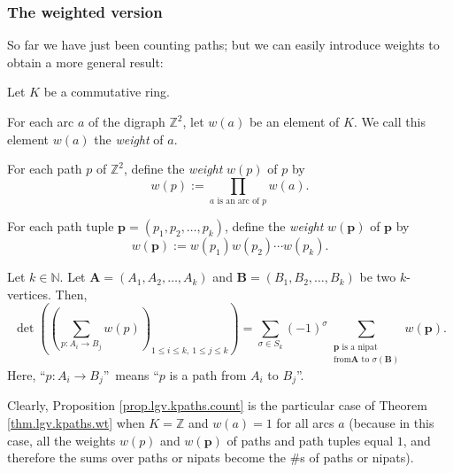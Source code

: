 \subsubsection{The weighted version}

So far we have just been counting paths; but we can easily introduce weights
to obtain a more general result:

\begin{theorem}
\label{thm.lgv.kpaths.wt}Let $K$ be a
commutative ring.

For each arc $a$ of the digraph $\mathbb{Z}^{2}$, let $w\left(  a\right)  $ be
an element of $K$. We call this element $w\left(  a\right)  $ the
\emph{weight} of $a$.

For each path $p$ of $\mathbb{Z}^{2}$, define the \emph{weight} $w\left(
p\right)  $ of $p$ by%
\[
w\left(  p\right)  :=\prod_{a\text{ is an arc of }p}w\left(  a\right)  .
\]


For each path tuple $\mathbf{p}=\left(  p_{1},p_{2},\ldots,p_{k}\right)  $,
define the \emph{weight} $w\left(  \mathbf{p}\right)  $ of $\mathbf{p}$ by%
\[
w\left(  \mathbf{p}\right)  :=w\left(  p_{1}\right)  w\left(  p_{2}\right)
\cdots w\left(  p_{k}\right)  .
\]


Let $k\in\mathbb{N}$. Let $\mathbf{A}=\left(  A_{1},A_{2},\ldots,A_{k}\right)
$ and $\mathbf{B}=\left(  B_{1},B_{2},\ldots,B_{k}\right)  $ be two
$k$-vertices. Then,%
\[
\det\left(  \left(  \sum_{p:A_{i}\rightarrow B_{j}}w\left(  p\right)  \right)
_{1\leq i\leq k,\ 1\leq j\leq k}\right)  =\sum_{\sigma\in S_{k}}\left(
-1\right)  ^{\sigma}\sum_{\substack{\mathbf{p}\text{ is a nipat}\\\text{from
}\mathbf{A}\text{ to }\sigma\left(  \mathbf{B}\right)  }}w\left(
\mathbf{p}\right)  .
\]
Here, \textquotedblleft$p:A_{i}\rightarrow B_{j}$\textquotedblright\ means
\textquotedblleft$p$ is a path from $A_{i}$ to $B_{j}$\textquotedblright.
\end{theorem}

Clearly, Proposition \ref{prop.lgv.kpaths.count} is the particular case of
Theorem \ref{thm.lgv.kpaths.wt} when $K=\mathbb{Z}$ and $w\left(  a\right)
=1$ for all arcs $a$ (because in this case, all the weights $w\left(
p\right)  $ and $w\left(  \mathbf{p}\right)  $ of paths and path tuples equal
$1$, and therefore the sums over paths or nipats become the \#s of paths or nipats).

